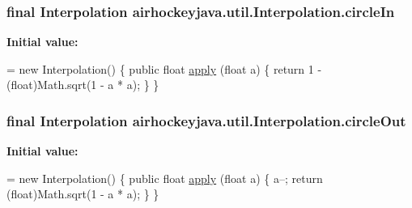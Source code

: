 \subsubsection[{circle\+In}]{\setlength{\rightskip}{0pt plus 5cm}final {\bf Interpolation} airhockeyjava.\+util.\+Interpolation.\+circle\+In\hspace{0.3cm}{\ttfamily [static]}}\label{classairhockeyjava_1_1util_1_1_interpolation_a1d8bbdc5615fbaad9c447f81f8eb0fbd}
{\bfseries Initial value\+:}
\begin{DoxyCode}
= \textcolor{keyword}{new} Interpolation() \{
        \textcolor{keyword}{public} \textcolor{keywordtype}{float} \hyperlink{classairhockeyjava_1_1util_1_1_interpolation_a21c50444fd69302dcf68703cb0d261ca}{apply} (\textcolor{keywordtype}{float} a) \{
            \textcolor{keywordflow}{return} 1 - (float)Math.sqrt(1 - a * a);
        \}
    \}
\end{DoxyCode}
\hypertarget{classairhockeyjava_1_1util_1_1_interpolation_ae62b2633ce108beeca6057a7061ae9de}{}
\subsubsection[{circle\+Out}]{\setlength{\rightskip}{0pt plus 5cm}final {\bf Interpolation} airhockeyjava.\+util.\+Interpolation.\+circle\+Out\hspace{0.3cm}{\ttfamily [static]}}\label{classairhockeyjava_1_1util_1_1_interpolation_ae62b2633ce108beeca6057a7061ae9de}
{\bfseries Initial value\+:}
\begin{DoxyCode}
= \textcolor{keyword}{new} Interpolation() \{
        \textcolor{keyword}{public} \textcolor{keywordtype}{float} \hyperlink{classairhockeyjava_1_1util_1_1_interpolation_a21c50444fd69302dcf68703cb0d261ca}{apply} (\textcolor{keywordtype}{float} a) \{
            a--;
            \textcolor{keywordflow}{return} (\textcolor{keywordtype}{float})Math.sqrt(1 - a * a);
        \}
    \}
\end{DoxyCode}
\hypertarget{classairhockeyjava_1_1util_1_1_interpolation_a9bd7861b65b58ba86ff9cff068491e17}{}
